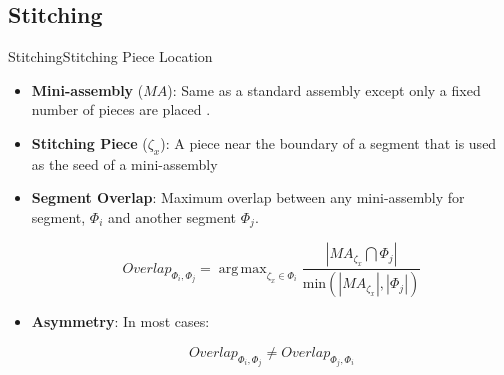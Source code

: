 \documentclass[10pt]{beamer}
\DeclareMathOperator*{\argmax}{arg\,max} %
\begin{document}
\subsection{Stitching}
\begin{frame}{Stitching}{Stitching Piece Location}
  \begin{itemize}
    \item \textbf{Mini-assembly} (\hspace{-0.1em}\textbf{$MA$}): Same as a standard assembly except only a fixed number of pieces are placed .
    \vfill    
    \item \textbf{Stitching Piece} (\textbf{$\zeta_x$}): A piece near the boundary of a segment that is used as the seed of a mini-assembly
    \vfill
    \item \textbf{Segment Overlap}: Maximum overlap between any mini-assembly for segment, $\Phi_i$ and another segment $\Phi_j$.
    \vfill
		\begin{center}  
		  \vspace{-2em}
			\begin{equation} \label{eq:segmentOverlap}
			  Overlap_{\Phi_i,\Phi_j} = \argmax_{\zeta_x \in \Phi_i} {\frac{|MA_{\zeta_x} \bigcap \Phi_j|}{\text{min}(|MA_{\zeta_x}|, |\Phi_j|)}}
			\end{equation}
			\vspace{-2em}
		\end{center}      
    \vfill
    \item \textbf{Asymmetry}: In most cases:
	  \begin{center}
	    \vspace{-2em}
	    \begin{equation}
	      Overlap_{\Phi_i,\Phi_j} \neq Overlap_{\Phi_j,\Phi_i}
	    \end{equation}
	  \end{center}  
	  \vspace{-1em}
  \end{itemize}
\end{frame}
\end{document}
